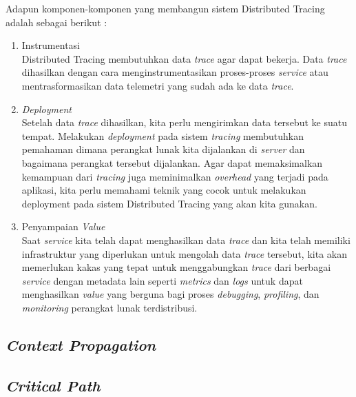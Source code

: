 Adapun komponen-komponen yang membangun sistem Distributed Tracing adalah sebagai berikut \citep{parker2020distributed}:
\begin{enumerate}
      \item Instrumentasi \\
            Distributed Tracing membutuhkan data \textit{trace} agar dapat bekerja.
            Data \textit{trace} dihasilkan dengan cara menginstrumentasikan proses-proses \textit{service} atau mentrasformasikan data telemetri yang sudah ada ke data \textit{trace}.
      \item \textit{Deployment} \\
            Setelah data \textit{trace} dihasilkan, kita perlu mengirimkan data tersebut ke suatu tempat.
            Melakukan \textit{deployment} pada sistem \textit{tracing} membutuhkan pemahaman dimana perangkat lunak kita dijalankan di \textit{server} dan bagaimana perangkat tersebut dijalankan.
            Agar dapat memaksimalkan kemampuan dari \textit{tracing} juga meminimalkan \textit{overhead} yang terjadi pada aplikasi, kita perlu memahami teknik yang cocok untuk melakukan deployment pada sistem Distributed Tracing yang akan kita gunakan.
      \item Penyampaian \textit{Value} \\
            Saat \textit{service} kita telah dapat menghasilkan data \textit{trace} dan kita telah memiliki infrastruktur yang diperlukan untuk mengolah data \textit{trace} tersebut, kita akan memerlukan kakas yang tepat untuk menggabungkan \textit{trace} dari berbagai \textit{service} dengan metadata lain seperti \textit{metrics} dan \textit{logs} untuk dapat menghasilkan \textit{value} yang berguna bagi proses \textit{debugging}, \textit{profiling}, dan \textit{monitoring} perangkat lunak terdistribusi.
\end{enumerate}

\subsection{\textit{Context Propagation}}

\subsection{\textit{Critical Path}}

%
%
%



